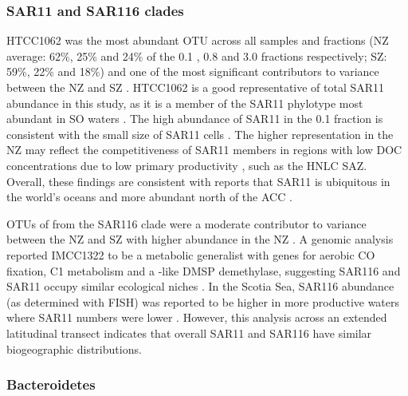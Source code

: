 \subsubsection{SAR11 and SAR116 clades}

 HTCC1062 was the most abundant \ac{OTU} across all samples and fractions (\ac{NZ} average: 62\%, 25\% and 24\% of the 0.1 \micron{}, 0.8 \micron{} and 3.0 \micron{} fractions respectively; \ac{SZ}: 59\%, 22\% and 18\%) and one of the most significant contributors to variance between the \ac{NZ} and \ac{SZ} .
 HTCC1062 is a good representative of total SAR11 abundance in this study, as it is a member of the SAR11 phylotype most abundant in \ac{SO} waters \cite{Brown:2012gna}.
The high abundance of SAR11 in the 0.1 \micron{} fraction is consistent with the small size of SAR11 cells \cite{Rappe:2002wz}.
The higher representation in the \ac{NZ} may reflect the competitiveness of SAR11 members in regions with low \ac{DOC} concentrations due to low primary productivity \cite{Giovannoni:2005ib,Alonso:2006dj}, such as the \ac{HNLC} \ac{SAZ}.
Overall, these findings are consistent with reports that SAR11 is ubiquitous in the world's oceans \cite{Mary:2006wk,Carlson:2009cc} and more abundant north of the \ac{ACC} \cite{Giebel:2009hr}.

\acp{OTU} of  from the SAR116 clade were a moderate contributor to variance between the \ac{NZ} and \ac{SZ} with higher abundance in the \ac{NZ} .
A genomic analysis reported  IMCC1322 to be a metabolic generalist with genes for aerobic CO fixation, C1 metabolism and a -like \ac{DMSP} demethylase, suggesting SAR116 and SAR11 occupy similar ecological niches \cite{Oh:2010di}.
In the Scotia Sea, SAR116 abundance (as determined with \ac{FISH}) was reported to be higher in more productive waters where SAR11 numbers were lower \cite{Topping:2006ul}.
However, this analysis across an extended latitudinal transect indicates that overall SAR11 and SAR116 have similar biogeographic distributions.

\subsubsection{Bacteroidetes}


